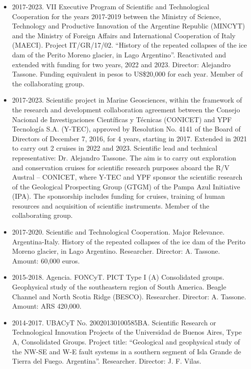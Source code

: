 \documentclass[11pt, a4paper]{article}
\begin{document}
\begin{itemize}
  \item 2017-2023. VII Executive Program of Scientific and Technological Cooperation for the years 2017-2019 between the Ministry of Science, Technology and Productive Innovation of the Argentine Republic (MINCYT) and the Ministry of Foreign Affairs and International Cooperation of Italy (MAECI). Project IT/GR/17/02. “History of the repeated collapses of the ice dam of the Perito Moreno glacier, in Lago Argentino”. Reactivated and extended with funding for two years, 2022 and 2023. Director: Alejandro Tassone. Funding equivalent in pesos to US\$20,000 for each year. Member of the collaborating group.

  \item 2017-2023. Scientific project in Marine Geosciences, within the framework of the research and development collaboration agreement between the Consejo Nacional de Investigaciones Científicas y Técnicas (CONICET) and YPF Tecnología S.A. (Y-TEC), approved by Resolution No. 4141 of the Board of Directors of December 7, 2016, for 4 years, starting in 2017. Extended in 2021 to carry out 2 cruises in 2022 and 2023. Scientific lead and technical representative: Dr. Alejandro Tassone. The aim is to carry out exploration and conservation cruises for scientific research purposes aboard the R/V Austral -- CONICET, where Y-TEC and YPF sponsor the scientific research of the Geological Prospecting Group (GTGM) of the Pampa Azul Initiative (IPA). The sponsorship includes funding for cruises, training of human resources and acquisition of scientific instruments. Member of the collaborating group.

  \item 2017-2020. Scientific and Technological Cooperation. Major Relevance. Argentina-Italy. History of the repeated collapses of the ice dam of the Perito Moreno glacier, in Lago Argentino. Researcher. Director: A. Tassone. Amount: 60,000 euros.

  \item 2015-2018. Agencia. FONCyT. PICT Type I (A) Consolidated groups. Geophysical study of the southeastern region of South America. Beagle Channel and North Scotia Ridge (BESCO). Researcher. Director: A. Tassone. Amount: ARS 420,000.

  \item 2014-2017. UBACyT No. 20020130100585BA. Scientific Research or Technological Innovation Projects of the Universidad de Buenos Aires, Type A, Consolidated Groups. Project title: “Geological and geophysical study of the NW-SE and W-E fault systems in a southern segment of Isla Grande de Tierra del Fuego. Argentina”. Researcher. Director: J. F. Vilas.


\end{itemize}
\end{document}
